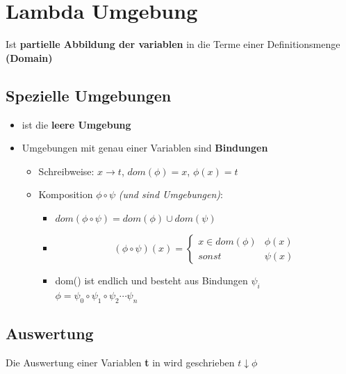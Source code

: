 \section{Lambda Umgebung}
Ist \textbf{partielle Abbildung der variablen} in die Terme
einer Definitionsmenge \textbf{(Domain)}

\subsection{Spezielle Umgebungen}
\begin{itemize}
    \item \varepsilon ist die \textbf{leere Umgebung}
    \item Umgebungen mit genau einer Variablen sind \textbf{Bindungen}
    \begin{itemize}
        \item Schreibweise: $x \rightarrow t$, $dom(\phi) = {x}$, $\phi(x)=t$
        \item Komposition $\phi \circ \psi$ \textit{(\phi und \psi sind Umgebungen)}:
        \begin{itemize}
            \item $dom(\phi \circ \psi) = dom(\phi) \cup dom(\psi)$
            \item \[(\phi \circ \psi)(x) =
                    \begin{cases}
                        x \in dom(\phi) & \phi(x) \\
                        sonst           & \psi(x)
                    \end{cases}\]
            \item dom(\phi) ist endlich und besteht aus Bindungen $\psi_i$ \\
            $\phi = \psi_0 \circ \psi_1 \circ \psi_2 \cdots \psi_n$
        \end{itemize}
    \end{itemize}
\end{itemize}

\subsection{Auswertung}
Die Auswertung einer Variablen \textbf{t} in \phi wird geschrieben $t \downarrow \phi$

